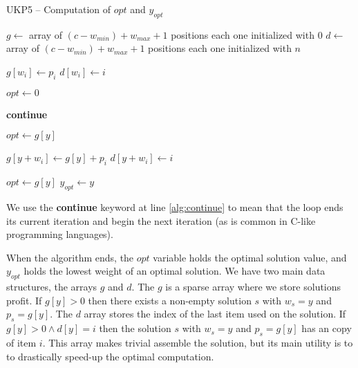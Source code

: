 \documentclass[runningheads,a4paper]{llncs}
\begin{document}
\begin{algorithm}[!t]
\caption{UKP5 -- Computation of $opt$ and $y_{opt}$}\label{alg:ukp5}
\begin{algorithmic}[1]
  \State \(g \gets\) array of \((c - w_{min}) + w_{max} + 1\) positions each one initialized with \(0\)\label{create_g}
  \State \(d \gets\) array of \((c - w_{min}) + w_{max} + 1\) positions each one initialized with \(n\)\label{create_d}
  
  \label{begin_trivial_bounds}
      \State \(g[w_i] \gets p_i\)
      \State \(d[w_i] \gets i\)
    \EndIf
  \EndFor\label{end_trivial_bounds}

  \State \(opt \gets 0\)\label{init_opt}

  \label{main_ext_loop_begin}
    \label{if_less_than_opt_begin}
    	\State \textbf{continue}\label{alg:continue}
    \EndIf\label{if_less_than_opt_end}
    
    \State \(opt \gets g[y]\)\label{update_opt}
    
    \label{main_inner_loop_begin}
      \label{if_new_lower_bound_begin}
        \State \(g[y + w_i] \gets g[y] + p_i\)
        \State \(d[y + w_i] \gets i\)
      \EndIf\label{if_new_lower_bound_end}
    \EndFor\label{main_inner_loop_end}
  \EndFor\label{main_ext_loop_end}

  \label{get_y_opt_loop_begin}
    \label{last_loop_inner_if}
      \State \(opt \gets g[y]\)
      \State \(y_{opt} \gets y\)
    \EndIf
  \EndFor\label{get_y_opt_loop_end}
\EndProcedure
\end{algorithmic}
\end{algorithm}

We use the \textbf{continue} keyword at line \ref{alg:continue} to mean that the loop ends its current iteration and begin the next iteration (as is common in C-like programming languages).

When the algorithm ends, the \(opt\) variable holds the optimal solution value, and \(y_{opt}\) holds the lowest weight of an optimal solution. We have two main data structures, the arrays \(g\) and \(d\). The \(g\) is a sparse array where we store solutions profit. If \(g[y] > 0\) then there exists a non-empty solution \(s\) with \(w_s = y\) and \(p_s = g[y]\). The \(d\) array stores the index of the last item used on the solution. If \(g[y] > 0 \land d[y] = i\) then the solution \(s\) with \(w_s = y\) and \(p_s = g[y]\) has an copy of item \(i\). This array makes trivial assemble the solution, but its main utility is to to drastically speed-up the optimal computation.
\end{document}
